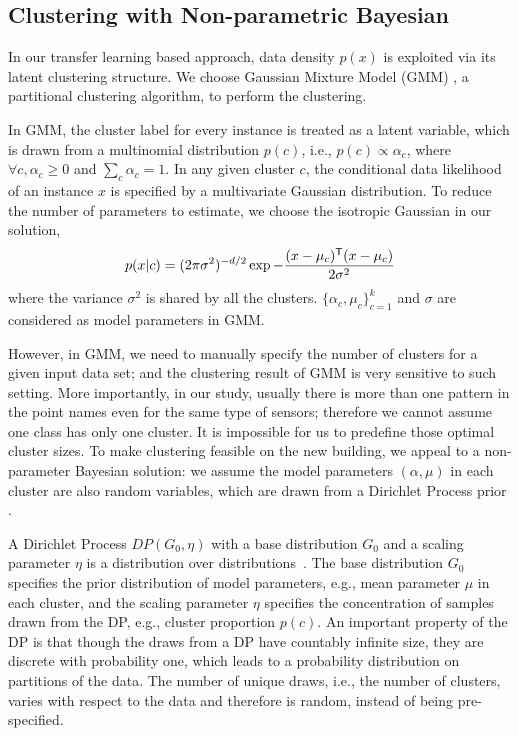 \subsection{Clustering with Non-parametric Bayesian}
\label{sec_clustering}
In our transfer learning based approach, data density $p(x)$ is exploited via its latent clustering structure. We choose Gaussian Mixture Model (GMM) \cite{zivkovic2004improved}, a partitional clustering algorithm, to perform the clustering.

In GMM, the cluster label for every instance is treated as a latent variable, which is drawn from a multinomial distribution $p(c)$, i.e., $p(c)\propto\alpha_c$, where $\forall c, \alpha_c\ge0$ and $\sum_c\alpha_c=1$. In any given cluster $c$, the conditional data likelihood of an instance $x$ is specified by a multivariate Gaussian distribution. To reduce the number of parameters to estimate, we choose the isotropic Gaussian in our solution,
\begin{equation}
p(x|c)=(2\pi\sigma^2)^{-d/2}\exp{-\frac{(x-\mu_c)^{\mathsf{T}}(x-\mu_c)}{2\sigma^2}}
\end{equation}
where the variance $\sigma^2$ is shared by all the clusters. $\{\alpha_c, \mu_c\}^k_{c=1}$ and $\sigma$ are considered as model parameters in GMM.

However, in GMM, we need to manually specify the number of clusters for a given input data set; and the clustering result of GMM is very sensitive to such setting. More importantly, in our study, usually there is more than one pattern in the point names even for the same type of sensors; therefore we cannot assume one class has only one cluster. It is impossible for us to predefine those optimal cluster sizes. To make clustering feasible on the new building, we appeal to a non-parameter Bayesian solution: we assume the model parameters $(\alpha, \mu)$ in each cluster are also random variables, which are drawn from a Dirichlet Process prior \cite{dp}.

A Dirichlet Process $DP(G_0, \eta)$ with a base distribution $G_0$ and a scaling parameter $\eta$ is a distribution over distributions~\cite{dp}. The base distribution $G_0$ specifies the prior distribution of model parameters, e.g., mean parameter $\mu$ in each cluster, and the scaling parameter $\eta$ specifies the concentration of samples drawn from the DP, e.g., cluster proportion $p(c)$. An important property of the DP is that though the draws from a DP have countably infinite size, they are discrete with probability one, which leads to a probability distribution on partitions of the data. The number of unique draws, i.e., the number of clusters, varies with respect to the data and therefore is random, instead of being pre-specified.

